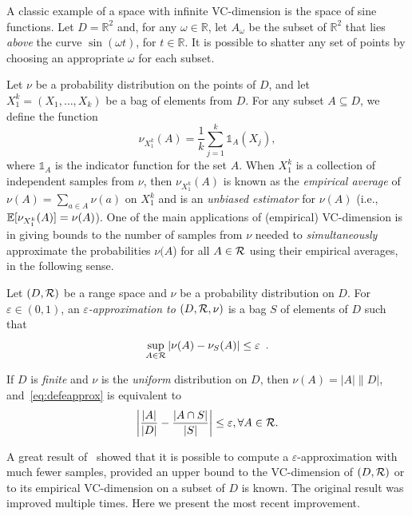 A classic example of a space with infinite VC-dimension is the space of sine
functions. Let $D=\mathbb{R}^2$ and, for any $\omega\in\mathbb{R}$, let
$A_{\omega}$ be the subset of $\mathbb{R}^2$ that lies \emph{above} the
curve $\sin(\omega t)$, for $t\in \mathbb{R}$. It is possible to
shatter any set of points by choosing an appropriate $\omega$ for each subset.

Let $\nu$ be a probability distribution on the points of $D$, and let
$X_1^k=(X_1,\dotsc,X_k)$ be a bag of elements from $D$. For any subset
$A\subseteq D$, we define the function 
\[
\nu_{X_1^k}(A)=\frac{1}{k}\sum_{j=1}^k\mathds{1}_A(X_j),\]
where $\mathds{1}_A$ is the indicator function for the set $A$. When $X_1^k$ is
a collection of independent samples from $\nu$, then $\nu_{X_1^k}(A)$ is known as the
\emph{empirical average} of $\nu(A)=\sum_{a\in A}\nu(a)$ on $X_1^k$ and is an
\emph{unbiased estimator} for $\nu(A)$ (i.e.,
$\mathbb{E}[\nu_{X_1^k}(A)]=\nu(A)$). One of the main applications of
(empirical) VC-dimension is in giving bounds to the number of samples from $\nu$
needed to \emph{simultaneously} approximate the probabilities $\nu(A$) for all
$A\in\mathcal{R}$ using their empirical averages, in the following sense.

\begin{definition}\label{def:eapprox}
  Let $(D,\mathcal{R})$ be a range space and $\nu$ be a probability distribution on
  $D$. For $\varepsilon\in(0,1)$, an \emph{$\varepsilon$-approximation to
  $(D,\mathcal{R},\nu)$} is a bag $S$ of elements of $D$ such that 
  \begin{equation}\label{eq:defeapprox}
  \sup_{A\in\mathcal{R}}|\nu(A)-\nu_S(A)|\le\varepsilon\enspace.
\end{equation}
\end{definition}

If $D$ is \emph{finite} and $\nu$ is the \emph{uniform} distribution on $D$, then
$\nu(A)=|A|\|D|$, and~\eqref{eq:defeapprox} is equivalent to
\[
\left|\frac{|A|}{|D|}-\frac{|A\cap S|}{|S|}\right|\le\varepsilon, \forall
A\in\mathcal{R}.
\]

A great result of~\citet{VapnikC71} showed that it is possible
to compute a $\varepsilon$-approximation with much fewer samples, provided an
upper bound to the VC-dimension of $(D,\mathcal{R})$ or to its empirical VC-dimension
on a subset of $D$ is known. The original result was improved multiple times.
Here we present the most recent improvement.


